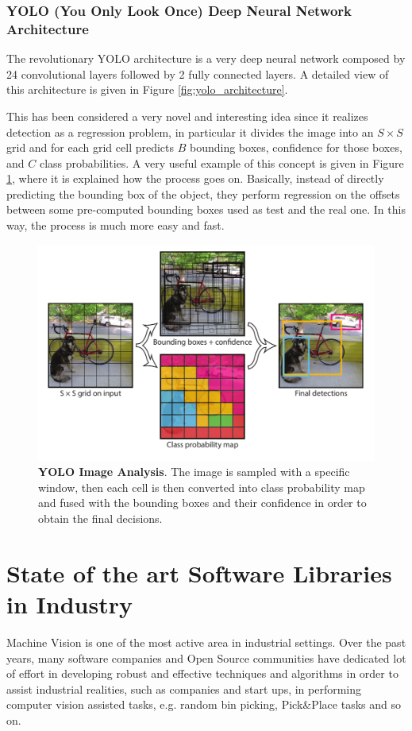\subsubsection{YOLO (You Only Look Once) Deep Neural Network Architecture}\label{subsubsec:yolo}
The revolutionary YOLO architecture is a very deep neural network composed by 24 convolutional layers followed by 2 fully connected layers. A detailed view of this architecture is given in Figure \ref{fig:yolo_architecture}.

This has been considered a very novel and interesting idea since it realizes detection as a regression problem, in particular it divides the image into an $S \times S$ grid and for each grid cell predicts $B$ bounding boxes, confidence for those boxes, and $C$ class probabilities. A very useful example of this concept is given in Figure \ref{fig:yolo_detail}, where it is explained how the process goes on. Basically, instead of directly predicting the bounding box of the object, they perform regression on the offsets between some pre-computed bounding boxes used as test and the real one. In this way, the process is much more easy and fast.

\begin{figure}
    \centering
    \includegraphics[width=\textwidth]{figures/1_perception_and_sensing_in_robotics/yolo_detail}
    \caption{\textbf{YOLO Image Analysis}. The image is sampled with a specific window, then each cell is then converted into class probability map and fused with the bounding boxes and their confidence in order to obtain the final decisions.} 
    \label{fig:yolo_detail}
\end{figure}

\section{State of the art Software Libraries in Industry}\label{sec:industrylibraries}
Machine Vision is one of the most active area in industrial settings. Over the past years, many software companies and Open Source communities have dedicated lot of effort in developing robust and effective techniques and algorithms in order to assist industrial realities, such as companies and start ups, in performing computer vision assisted tasks, e.g. random bin picking, Pick\&Place tasks and so on.


